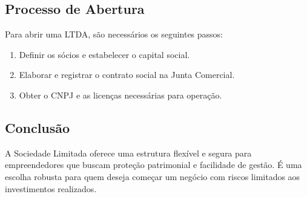 \subsection{Processo de Abertura}
\noindent Para abrir uma LTDA, são necessários os seguintes passos:
\begin{enumerate}
    \item Definir os sócios e estabelecer o capital social.
    \item Elaborar e registrar o contrato social na Junta Comercial.
    \item Obter o CNPJ e as licenças necessárias para operação.
\end{enumerate}

\subsection{Conclusão}
A Sociedade Limitada oferece uma estrutura flexível e segura para empreendedores que buscam proteção patrimonial e facilidade de gestão. É uma escolha robusta para quem deseja começar um negócio com riscos limitados aos investimentos realizados.
